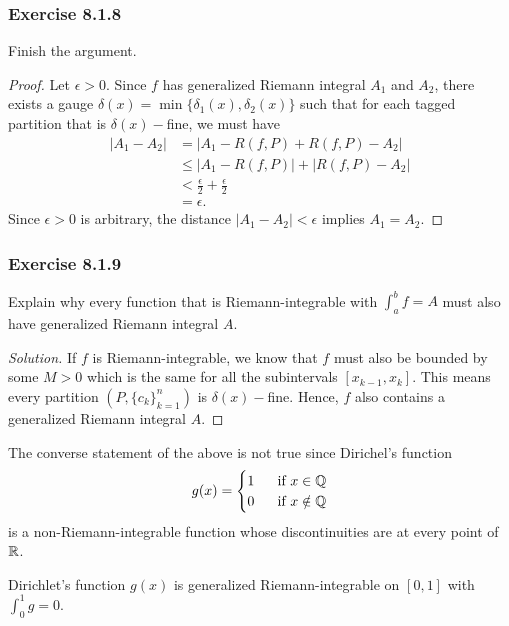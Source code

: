 \subsubsection{Exercise 8.1.8} Finish the argument.
\begin{proof}
Let \( \epsilon > 0  \). Since \( f  \) has generalized Riemann integral \( A_{1} \) and \( A_{2} \), there exists a gauge \( \delta(x) = \min \{ \delta_1(x), \delta_2(x)  \}  \) such that for each tagged partition that is \( \delta(x)- \)fine, we must have
\begin{align*}
    | A_{1} - A_{2} | &= \Big| A_{1} - R(f,P) + R(f,P) - A_{2} \Big|   \\
                      &\leq | A_{1} - R(f,P)  | + | R(f,P) - A_{2} | \\
                      &< \frac{ \epsilon  }{ 2 }  + \frac{ \epsilon  }{ 2 } \\
                      &= \epsilon.
\end{align*}
Since \( \epsilon > 0  \) is arbitrary, the distance \( | A_{1} - A_{2}  | < \epsilon \) implies \( A_{1} = A_{2} \).
\end{proof}

\subsubsection{Exercise 8.1.9} Explain why every function that is Riemann-integrable with \( \int_{ a }^{ b } f = A  \) must also have generalized Riemann integral \( A  \).
\begin{proof}[Solution]
    If \( f \) is Riemann-integrable, we know that \( f  \) must also be bounded by some \( M > 0  \) which is the same for all the subintervals \( [ x_{k-1}, x_{k }] \). This means every partition \( (P, \{ c_{k } \}_{k=1}^n) \) is \( \delta(x)- \)fine. Hence, \( f  \) also contains a generalized Riemann integral \( A  \). 
\end{proof}

The converse statement of the above is not true since Dirichel's function 
\[  g(x) = 
\begin{cases}
    1 \ &\text{ if } x \in \mathbb{Q} \\
    0 \ &\text{ if } x \notin \mathbb{Q} 
\end{cases} \]
is a non-Riemann-integrable function whose discontinuities are at every point of \( \mathbb{R}  \).

\begin{theorem}{}{}
    Dirichlet's function \( g(x)  \) is generalized Riemann-integrable on \( [0,1]  \) with \( \int_{ 0 }^{ 1 } g = 0  \).
\end{theorem}

